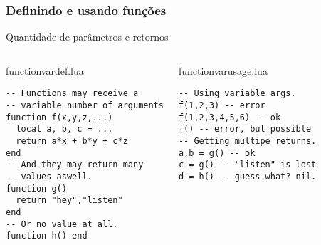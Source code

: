 \documentclass[brazil]{beamer}
\begin{document}
\begin{frame}[fragile]
  \frametitle{Definindo e usando funções}
  \pause
  \begin{center}
    Quantidade de parâmetros e retornos
  \end{center}
  \pause
  \begin{columns}
      \begin{block}{functionvardef.lua}
        \begin{lstlisting}
-- Functions may receive a
-- variable number of arguments
function f(x,y,z,...)
  local a, b, c = ...
  return a*x + b*y + c*z
end
-- And they may return many
-- values aswell.
function g()
  return "hey","listen"
end
-- Or no value at all.
function h() end
        \end{lstlisting}
      \end{block}
    \pause
      \begin{block}{functionvarusage.lua}
        \begin{lstlisting}
-- Using variable args.
f(1,2,3) -- error
f(1,2,3,4,5,6) -- ok
f() -- error, but possible
-- Getting multipe returns.
a,b = g() -- ok
c = g() -- "listen" is lost
d = h() -- guess what? nil.
        \end{lstlisting}
      \end{block}
  \end{columns}
\end{frame}
\end{document}
